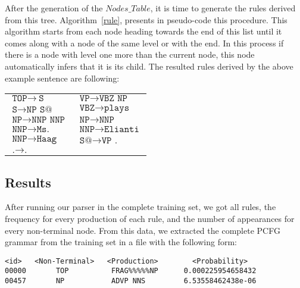 \documentclass[a4paper,11pt]{article}
\begin{document}
After the generation of the $Nodes\_Table$, it is time to generate the rules derived from this tree. Algorithm~\ref{rule}, presents in pseudo-code this procedure. This algorithm starts from each node heading towards the end of this list until it comes along with a node of the same level or with the end. In this process if there is a node with level one more than the current node, this node automatically infers that it is its child. The resulted rules derived by the above example sentence are following:
\begin{table}[h!]
\begin{scriptsize}
\begin{center}
\begin{tabular}{ l l }
$\texttt{TOP} \rightarrow\ \texttt{S}$ & $\texttt{VP} \rightarrow \texttt{VBZ NP}$ \\
$\texttt{S} \rightarrow \texttt{NP S@}$ & $\texttt{VBZ} \rightarrow \texttt{plays}$ \\
$\texttt{NP} \rightarrow \texttt{NNP NNP}$ & $\texttt{NP} \rightarrow \texttt{NNP}$ \\
$\texttt{NNP} \rightarrow \texttt{Ms.}$ & $\texttt{NNP} \rightarrow \texttt{Elianti}$ \\
$\texttt{NNP} \rightarrow \texttt{Haag}$ & $\texttt{S@} \rightarrow \texttt{VP .}$  \\
$\texttt{.} 	\rightarrow \texttt{.}$ & $ $
\end{tabular}
\end{center}
\end{scriptsize}
\end{table}

\subsection{Results}
After running our parser in the complete training set, we got all rules, the frequency for every production of each rule, and the number of appearances for every non-terminal node. From this data, we extracted the complete PCFG grammar from the training set in a file with the following form:
\begin{verbatim}
<id>   <Non-Terminal>   <Production>        <Probability>
00000       TOP          FRAG%%%%%NP      0.000225954658432 
00457       NP           ADVP NNS         6.53558462438e-06
\end{verbatim}
\end{document}

